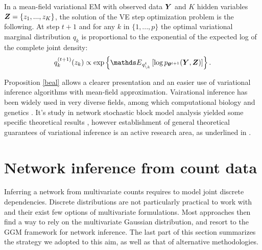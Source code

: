  \begin{prop}\label{beal}
In a  mean-field variational EM with observed data ${\boldsymbol{Y}}$ and $K$ hidden variables ${\boldsymbol{Z}}=\{z_1,...,z_K\}$, the solution of the VE step optimization problem is the following. At step $t+1$ and for any $k$ in $\{1,...,p\}$ the optimal variational marginal distribution $q_k$ is proportional to the exponential of the expected log of the complete joint density:
$$ q_k^{(t+1)}(z_k)  \propto \exp \left\{ \Esp_{q_{\setminus k}^t} \left[ \log p_{\thetabf^{t+1}}(\Ybf, \Zbf) \right] \right\}.$$
\end{prop}

Proposition \ref{beal} allows a clearer presentation and an easier use of variational inference algorithms with mean-field approximation. Vairational inference has been widely used in very diverse fields, among which computational biology and genetics \citep{CS12,RSP14}. It's study in network stochastic block model analysis yielded some specific theoretical results \citep{CDP12,BCC13}, however establishment of general theoretical guarantees of variational inference is an active research area, as underlined in \citet{BKM17}. 

\section{Network inference from count data}
 Inferring a network  from multivariate counts requires to model joint discrete dependencies. Discrete distributions are not particularly practical to work with and their exist few options of multivariate formulations.  Most approaches then find a way to rely on the multivariate Gaussian distribution, and resort to the GGM framework for network inference. The last part of this section summarizes the strategy we adopted to this aim, as well as that of alternative methodologies.
  
 
